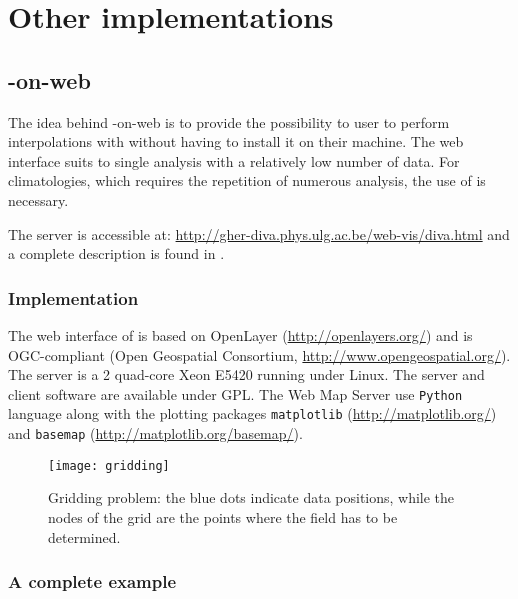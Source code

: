 \chapter{Other implementations\label{chap:divaonweb}}

\lettrine[lines=2, loversize=-0.1, lraise=0.1]{}{} 

\minitoc

\newpage %

\section{\diva-on-web}

The idea behind \diva-on-web is to provide the possibility to user to perform interpolations with \diva without having to install it on their machine. The web interface suits to single analysis with a relatively low number of data. For climatologies, which requires the repetition of numerous analysis, the use of \diva is necessary.

The server is accessible at: \url{http://gher-diva.phys.ulg.ac.be/web-vis/diva.html} and a complete description is found in \citet{BARTH10}.


\subsection{Implementation}

The web interface of \diva is based on OpenLayer (\url{http://openlayers.org/}) and is OGC-compliant (Open Geospatial Consortium, \url{http://www.opengeospatial.org/}). The server is a 2 quad-core Xeon E5420 running under Linux. The server and client software are available under GPL. The Web Map Server use \texttt{Python} language along with the plotting packages \texttt{matplotlib} (\url{http://matplotlib.org/}) and \texttt{basemap} (\url{http://matplotlib.org/basemap/}). 

\begin{figure}[htpb]
	\centering
	\parbox{.5\textwidth}{
		\texttt{[image: gridding]}
		}\parbox{.5\textwidth}{
		\caption{Gridding problem: the blue dots indicate data positions, while the nodes of the grid  are the points where the field has to be determined.\label{gridproblem}}
		}
\end{figure}

\subsection{A complete example}

